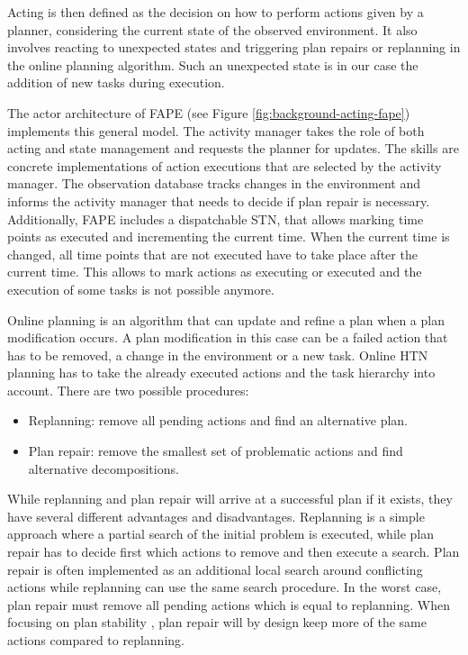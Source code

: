 Acting is then defined as the decision on how to perform actions given by a planner, considering the current state of the observed environment.
It also involves reacting to unexpected states and triggering plan repairs or replanning in the online planning algorithm.
Such an unexpected state is in our case the addition of new tasks during execution.

The actor architecture of \ac{FAPE} (see Figure \ref{fig:background-acting-fape}) implements this general model.
The activity manager takes the role of both acting and state management and requests the planner for updates.
The skills are concrete implementations of action executions that are selected by the activity manager.
The observation database tracks changes in the environment and informs the activity manager that needs to decide if plan repair is necessary.
Additionally, \ac{FAPE} includes a dispatchable \ac{STN}, that allows marking time points as executed and incrementing the current time.
When the current time is changed, all time points that are not executed have to take place after the current time.
This allows to mark actions as executing or executed and the execution of some tasks is not possible anymore.




Online planning \citep[sec.~2.6.2]{ghallabAutomatedPlanningActing2016} is an algorithm that can update and refine a plan when a plan modification occurs.
A plan modification in this case can be a failed action that has to be removed, a change in the environment or a new task.
Online \ac{HTN} planning \citep{dvorakPlanningActingTemporal2014} has to take the already executed actions and the task hierarchy into account.
There are two possible procedures:
\begin{itemize}
  \item Replanning: remove all pending actions and find an alternative plan.
  \item Plan repair: remove the smallest set of problematic actions and find alternative decompositions.
\end{itemize}

While replanning and plan repair will arrive at a successful plan if it exists, they have several different advantages and disadvantages.
Replanning is a simple approach where a partial search of the initial problem is executed, while plan repair has to decide first which actions to remove and then execute a search.
Plan repair is often implemented as an additional local search around conflicting actions \citep{bajadaTemporalPlanQuality2014} while replanning can use the same search procedure.
In the worst case, plan repair must remove all pending actions which is equal to replanning.
When focusing on plan stability \citep{foxPlanStabilityReplanning2006}, plan repair will by design keep more of the same actions compared to replanning.

